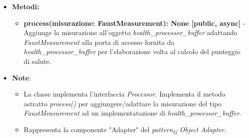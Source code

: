 \begin{itemize}
\begin{itemize}
    \item \textbf{Metodi: }
    \begin{itemize}
        \item \textbf{process(misurazione: FaustMeasurement): None [public, async]} - Aggiunge la misurazione all'oggetto \textit{health\_processor\_buffer} adattando \textit{FaustMeasurement} alla porta di accesso fornita da \textit{health\_processor\_buffer} per l'elaborazione volta al calcolo del punteggio di salute.
    \end{itemize}
    \item\textbf{Note}:
        \begin{itemize}
            \item La classe implementa l'interfaccia \textit{Processor}. Implementa il metodo astratto \textit{process()} per aggiungere/adattare la misurazione del tipo \textit{FaustMeasurement} ad un implementatazione di \textit{health\_processor\_buffer}.
            \item Rappresenta la componente "Adapter" del \textit{pattern}\textsubscript{\textit{G}} \textit{Object Adapter}.
        \end{itemize}
    \end{itemize}
\end{itemize}